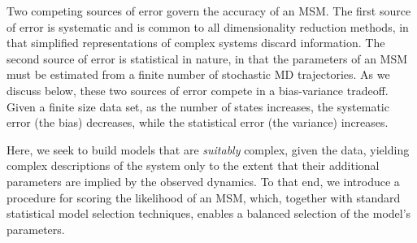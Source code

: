 \documentclass[journal=jpcbfk, layout=traditional, manuscript=article]{achemso}
\begin{document}

Two competing sources of error govern the accuracy of an MSM. The first source of error is systematic and is common to all dimensionality reduction methods, in that simplified representations of complex systems discard information. The second source of error is statistical in nature, in that the parameters of an MSM must be estimated from a finite number of stochastic MD trajectories. As we discuss below, these two sources of error compete in a bias-variance tradeoff\cite{Sammut2010Encyclopedia}. Given a finite size data set, as the number of states increases, the systematic error (the bias) decreases, while the statistical error (the variance) increases.

Here, we seek to build models that are \emph{suitably} complex, given the data, yielding complex descriptions of the system only to the extent that their additional parameters are implied by the observed dynamics. To that end, we introduce a procedure for scoring the likelihood of an MSM, which, together with standard statistical model selection techniques, enables a balanced selection of the model's parameters. 
\end{document}

